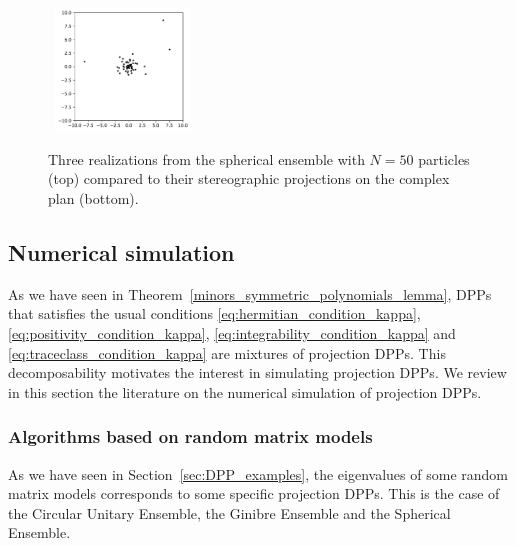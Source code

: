 \documentclass[twoside,11pt]{book}
\newtheorem{theorem}{Theorem}
\numberwithin{theorem}{chapter}
\numberwithin{definition}{chapter}
\numberwithin{proposition}{chapter}
\numberwithin{corollary}{chapter}
\numberwithin{example}{chapter}
\numberwithin{lemma}{chapter}
\numberwithin{assumption}{chapter}
\begin{document}
\begin{figure}
~\includegraphics[width= 0.32\textwidth]{img/Spherical/Spherical_beforestero_50_example_id_3.pdf}\\
\caption{Three realizations from the spherical ensemble with $N = 50$ particles (top) compared to their stereographic projections on the complex plan (bottom). \label{fig:spherical_ensemble}}
\end{figure}



\subsection{Numerical simulation}\label{sec:num_algos_dpps}
As we have seen in Theorem~\ref{minors_symmetric_polynomials_lemma}, DPPs that satisfies the usual  conditions \eqref{eq:hermitian_condition_kappa}, \eqref{eq:positivity_condition_kappa}, \eqref{eq:integrability_condition_kappa} and \eqref{eq:traceclass_condition_kappa} are mixtures of projection DPPs. This decomposability motivates the interest in simulating projection DPPs. We review in this section the literature on the numerical simulation of projection DPPs.

\subsubsection{Algorithms based on random matrix models}
As we have seen in Section~\ref{sec:DPP_examples}, the eigenvalues of some random matrix models corresponds to some specific projection DPPs. This is the case of the Circular Unitary Ensemble, the Ginibre Ensemble and the Spherical Ensemble. 
\end{document}
